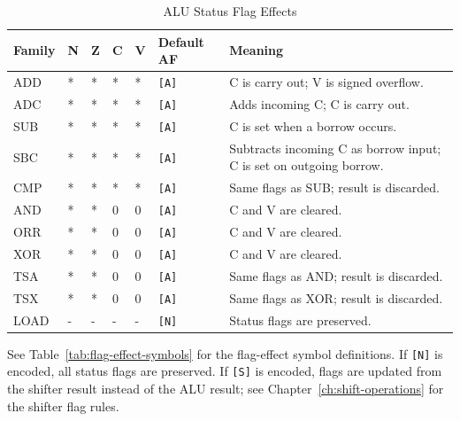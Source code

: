 \begin{table}[H]
	\centering
	\begin{tabular}{llllllp{5.5cm}}
		\toprule
		\textbf{Family} & \textbf{N} & \textbf{Z} & \textbf{C} & \textbf{V} & \textbf{Default AF} & \textbf{Meaning} \\
		\midrule
		ADD             & *          & *          & *          & *          & \texttt{[A]}        & C is carry out; V is signed overflow. \\
		ADC             & *          & *          & *          & *          & \texttt{[A]}        & Adds incoming C; C is carry out. \\
		SUB             & *          & *          & *          & *          & \texttt{[A]}        & C is set when a borrow occurs. \\
		SBC             & *          & *          & *          & *          & \texttt{[A]}        & Subtracts incoming C as borrow input; C is set on outgoing borrow. \\
		CMP             & *          & *          & *          & *          & \texttt{[A]}        & Same flags as SUB; result is discarded. \\
		AND             & *          & *          & 0          & 0          & \texttt{[A]}        & C and V are cleared. \\
		ORR             & *          & *          & 0          & 0          & \texttt{[A]}        & C and V are cleared. \\
		XOR             & *          & *          & 0          & 0          & \texttt{[A]}        & C and V are cleared. \\
		TSA             & *          & *          & 0          & 0          & \texttt{[A]}        & Same flags as AND; result is discarded. \\
		TSX             & *          & *          & 0          & 0          & \texttt{[A]}        & Same flags as XOR; result is discarded. \\
		LOAD            & -          & -          & -          & -          & \texttt{[N]}        & Status flags are preserved. \\
		\bottomrule
	\end{tabular}
	\caption{ALU Status Flag Effects}
	\label{tab:alu-status-flag-effects}
\end{table}

See Table~\ref{tab:flag-effect-symbols} for the flag-effect symbol definitions. If \texttt{[N]} is encoded, all status
flags are preserved. If \texttt{[S]} is encoded, flags are updated from the shifter result instead of the ALU result; see
Chapter~\ref{ch:shift-operations} for the shifter flag rules.

